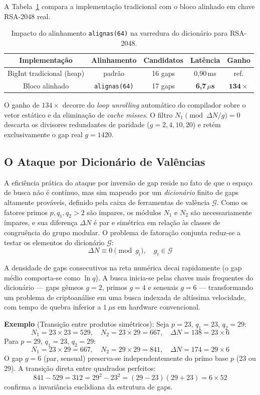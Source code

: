 \documentclass[12pt,a4paper]{article}
\theoremstyle{plain}
\begin{document}
A Tabela~\ref{tab:alinhamento_l1} compara a implementação tradicional
com o bloco alinhado em chave RSA-2048 real.

\begin{table}[htbp]
\centering
\caption{Impacto do alinhamento \texttt{alignas(64)} na varredura do
dicionário para RSA-2048.}
\label{tab:alinhamento_l1}
\begin{tabular}{ccccc}
\hline
Implementação & Alinhamento & Candidatos & Latência & Ganho \\
\hline
BigInt tradicional (heap) & padrão & 16 gaps & 0,90\,ms & ref. \\
Bloco alinhado & \texttt{alignas(64)} & 17 gaps & \textbf{6,7\,$\mu$s} & $\mathbf{134\times}$ \\
\hline
\end{tabular}
\end{table}

O ganho de $134\times$ decorre do \textit{loop unrolling} automático do
compilador sobre o vetor estático e da eliminação de \textit{cache
misses}.  O filtro $N_1 \pmod{\Delta N / g} = 0$ descarta os divisores
redundantes de paridade ($g=2,4,10,20$) e retém exclusivamente o gap
real $g=1420$.

\subsection{O Ataque por Dicionário de Valências}

A eficiência prática do ataque por inversão de gap reside no fato de
que o espaço de busca não é contínuo, mas sim mapeado por um
\textit{dicionário} finito de gaps altamente prováveis, definido pela
caixa de ferramentas de valência $\mathcal{G}$.  Como os fatores primos
$p, q_1, q_2 > 2$ são ímpares, os módulos $N_1$ e $N_2$ são
necessariamente ímpares, e sua diferença $\Delta N$ é par e simétrica
em relação às classes de congruência do grupo modular.  O problema de
fatoração conjunta reduz-se a testar os elementos do dicionário
$\mathcal{G}$:
\[
\Delta N \equiv 0 \pmod{g_i}, \quad g_i \in \mathcal{G}
\]

A densidade de gaps consecutivos na reta numérica decai rapidamente
(o gap médio comporta-se como $\ln q$).  A busca inicia-se pelas
chaves mais frequentes do dicionário --- gaps gêmeos $g=2$, primos
$g=4$ e sensuais $g=6$ --- transformando um problema de criptoanálise
em uma busca indexada de altíssima velocidade, com tempo de quebra
inferior a $1~\mu\text{s}$ em hardware convencional.

\noindent\textbf{Exemplo} (Transição entre produtos simétricos):
Seja $p = 23$, $q_1 = 23$, $q_2 = 29$:
\[
N_1 = 23 \times 23 = 529,\quad
N_2 = 23 \times 29 = 667,\quad
\Delta N = 138 = 23 \times 6
\]
Para $p = 29$, $q_1 = 23$, $q_2 = 29$:
\[
N_1 = 23 \times 29 = 667,\quad
N_2 = 29 \times 29 = 841,\quad
\Delta N = 174 = 29 \times 6
\]
O gap $g = 6$ (par, sensual) preserva-se independentemente do primo
base $p$ (23 ou 29).  A transição direta entre quadrados perfeitos:
\[
841 - 529 = 312 = 29^2 - 23^2 = (29-23)(29+23) = 6 \times 52
\]
confirma a invariância euclidiana da estrutura de gaps.
\end{document}
